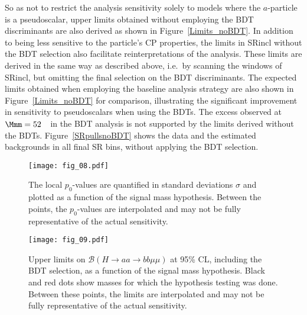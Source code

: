 \documentclass[cernpreprint, backref=false, texlive=2020, UKenglish, dvipsnames, block=none, texmf]{atlasdoc}
\begin{document}
So as not to restrict the analysis sensitivity solely to models where the $a$-particle is a pseudoscalar, upper limits obtained without employing the BDT discriminants are also derived as shown in Figure~\ref{Limits_noBDT}.
In addition to being less sensitive to the particle's CP properties, the limits in SRincl without the BDT selection also facilitate reinterpretations of the analysis.
These limits are derived in the same way as described above, i.e.\ by scanning the \Mmm windows of SRincl, but omitting the final selection on the BDT discriminants. The expected limits obtained when employing the baseline analysis strategy are also shown in Figure~\ref{Limits_noBDT} for comparison, illustrating the significant improvement in sensitivity to pseudoscalars when using the BDTs. The excess observed at $\Mmm=52$~\GeV\ in the BDT analysis is not supported by the limits derived without the BDTs.
Figure~\ref{SRpullsnoBDT} shows the data and the estimated backgrounds in all final SR bins, without applying the BDT selection.
 
 
 
 
 
\begin{figure}
\centering
\texttt{[image: fig\_08.pdf]}
\caption{The local $p_0$-values are quantified in standard deviations $\sigma$ and plotted as a function of the signal mass hypothesis. Between the points, the $p_0$-values are interpolated and may not be fully representative of the actual sensitivity.}
\label{pvalue}
\end{figure}
 
 
 
\begin{figure}
\centering
\texttt{[image: fig\_09.pdf]}
\caption{Upper limits on $\mathcal{B}(H \rightarrow aa \rightarrow bb\mu\mu)$ at 95\% CL, including the BDT selection, as a function of the signal mass hypothesis. Black and red dots show masses for which the hypothesis testing was done. Between these points, the limits are interpolated and may not be fully representative of the actual sensitivity.}
\label{Limits}
\end{figure}
 
 
 
 
 
\end{document}
